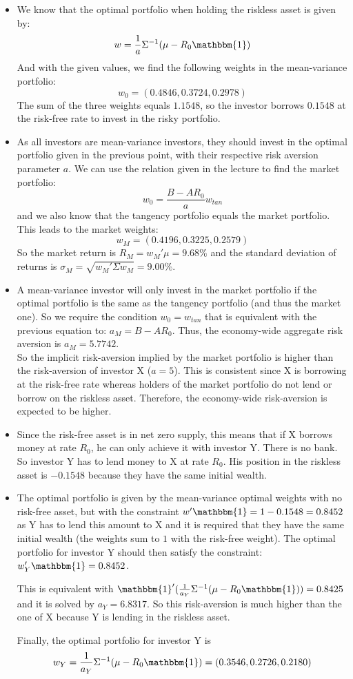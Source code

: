 \documentclass[10pt]{article}
\newenvironment{exercise}[2][Exercise]{\begin{trivlist}
  \item[\hskip \labelsep {\bfseries #1}\hskip \labelsep {\bfseries #2.}]}{\end{trivlist}}
\begin{document}
\begin{exercise}{4} 
	
\begin{itemize} 
	\item We know that the optimal portfolio when holding the riskless asset is given by: $$ w = \frac{1}{a}\Sigma^{-1}(\mu-R_0\mathbbm{1})$$
	And with the given values, we find the following weights in the mean-variance portfolio: $$ w_0 = (0.4846,0.3724,0.2978)$$ The sum of the three weights equals $1.1548$, so the investor borrows $0.1548$ at the risk-free rate to invest in the risky portfolio. 
	\item As all investors are mean-variance investors, they should invest in the optimal portfolio given in the previous point, with their respective risk aversion parameter $a$. We can use the relation given in the lecture to find the market portfolio: 
	$$w_0 = \frac{B-AR_0}{a}w_{tan}$$ and we also know that the tangency portfolio equals the market portfolio. This leads to the market weights: 
	$$ w_M = (0.4196, 0.3225, 0.2579)$$
	So the market return is $R_M = w_M'\mu = 9.68\%$ and the standard deviation of returns is $\sigma_M = \sqrt{w_M'\Sigma w_M} = 9.00\%$.
	\item A mean-variance investor will only invest in the market portfolio if the optimal portfolio is the same as the tangency portfolio (and thus the market one). So we require the condition $w_0 = w_{tan}$ that is equivalent with the previous equation to: $a_M = B-AR_0$. Thus, the economy-wide aggregate risk aversion is $a_M = 5.7742$. 
	\\
	So the implicit risk-aversion implied by the market portfolio is higher than the risk-aversion of investor X ($a=5$). This is consistent since X is borrowing at the risk-free rate whereas holders of the market portfolio do not lend or borrow on the riskless asset. Therefore, the economy-wide risk-aversion is expected to be higher. 
	\item Since the risk-free asset is in net zero supply, this means that if X borrows money at rate $R_0$, he can only achieve it with investor Y. There is no bank. So investor Y has to lend money to X at rate $R_0$. His position in the riskless asset is $-0.1548$ because they have the same initial wealth.  
	\item The optimal portfolio is given by the mean-variance optimal weights with no risk-free asset, but with the constraint $w'\mathbbm{1} = 1 - 0.1548 = 0.8452$ as Y has to lend this amount to X and it is required that they have the same initial wealth (the weights sum to $1$ with the risk-free weight).
	The optimal portfolio for investor Y should then satisfy the constraint: $w_Y'\mathbbm{1} = 0.8452$. 
	
	This is equivalent with $\mathbbm{1}'(\frac{1}{a_Y}\Sigma^{-1}(\mu-R_0\mathbbm{1}))= 0.8425$ and it is solved by $a_Y = 6.8317$. So this risk-aversion is much higher than the one of X because Y is lending in the riskless asset. 

	Finally, the optimal portfolio for investor Y is $$w_Y = \frac{1}{a_Y}\Sigma^{-1}(\mu-R_0\mathbbm{1}) = (0.3546, 0.2726, 0.2180)$$

\end{itemize}
\end{exercise}
  
\end{document}
